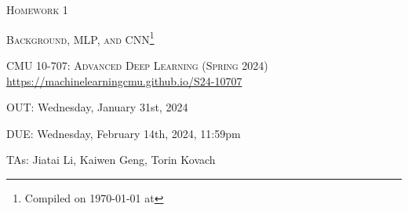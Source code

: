 \documentclass[12pt]{article}
\begin{document}


\section*{}
\begin{center}
    \centerline{\textsc{\LARGE  Homework 1}}
    \vspace{0.5em}
    \centerline{\textsc{\LARGE Background, MLP, and CNN}\footnote{Compiled on \today{} at \currenttime{}}}
    \vspace{1em}
    
    \textsc{\large CMU 10-707: Advanced Deep Learning (Spring 2024)} \\
    \vspace{0.5em}
    \url{https://machinelearningcmu.github.io/S24-10707} \\
    \vspace{1em}
    \centerline{OUT: Wednesday, January 31st, 2024}
    \centerline{DUE: Wednesday, February 14th, 2024, 11:59pm}
    \centerline{TAs: Jiatai Li, Kaiwen Geng, Torin Kovach}
\end{center}



\clearpage

\clearpage

\clearpage

\clearpage

\clearpage

\clearpage

\clearpage

\clearpage
\end{document}
